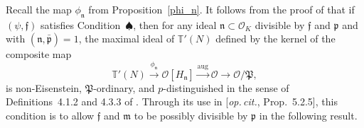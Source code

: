 \documentclass[10pt,letterpaper]{amsart}
\theoremstyle{plain}
\theoremstyle{definition}
\newtheorem{rmk}[thm]{Remark}
\newtheorem{assumption}{Assumption}[section]
\theoremstyle{definition}
\theoremstyle{plain}
\theoremstyle{plain}
\theoremstyle{plain}
\theoremstyle{remark}
\newtheorem{notation}[thm]{Notation}
\numberwithin{equation}{section}
\newcommand{\pp}{\mathfrak{p}}
\newcommand{\ppbar}{\bar{\mathfrak{p}}}
\newcommand{\fkm}{\mathfrak{m}}
\newcommand{\fkf}{\mathfrak{f}}
\newcommand{\fkn}{\mathfrak{n}}
\def\cO{\mathcal O}
\begin{document}


Recall the map $\phi_{\fkn}$ from Proposition~\ref{phi_n}. It follows from the proof of \cite[Prop.~5.1.2]{LLZ-K} that if $(\psi,\fkf)$ satisfies Condition~$\spadesuit$, then for any ideal $\fkn\subset\cO_K$ divisible by $\mathfrak{f}$ and $\pp$ and with $(\fkn,\ppbar)=1$, the maximal ideal of $\mathbb{T}'(N)$ defined by the kernel of the composite map
\[
\mathbb{T}'(N)\overset{\phi_\fkn}\longrightarrow\cO[H_\fkn]\overset{{\mathrm{aug}}}\longrightarrow\cO\rightarrow\cO/\mathfrak{P},
\]
is non-Eisenstein, $\mathfrak{P}$-ordinary, and $p$-distinguished in the sense of Definitions~4.1.2 and 4.3.3 of \cite{LLZ-K}. Through its use in [\emph{op.\,cit.}, Prop.~5.2.5], this condition is to allow $\fkf$ and $\fkm$ to be possibly divisible by $\pp$ in the following result.


\end{document}
